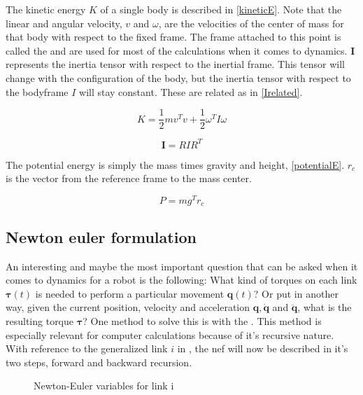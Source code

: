 The kinetic energy $K$ of a single body is described in \eqref{kineticE}. Note that the linear and angular velocity, $v$ and $\omega$, are the velocities of the center of mass for that body with respect to the fixed frame. The frame attached to this point is called the  and are used for most of the calculations when it comes to dynamics. $\mathbf{I}$ represents the inertia tensor with respect to the inertial frame.  This tensor will change with the configuration of the body, but the inertia tensor with respect to the \gls{bodyframe} $I$ will stay constant. These are related as in \eqref{Irelated}.

\begin{equation}\label{kineticE}
K = \frac{1}{2}mv^Tv + \frac{1}{2}\omega ^{T}  I \omega
\end{equation}

\begin{equation}\label{Irelated}
\mathbf{I} = RIR^T
\end{equation}

The potential energy is simply the mass times gravity and height, \eqref{potentialE}. $r_c$ is the vector from the reference frame to the mass center.

\begin{equation}\label{potentialE}
P = mg^Tr_c
\end{equation}



\subsection{Newton euler formulation}

An interesting and maybe the most important question that can be asked when it comes to dynamics for a robot is the following: What kind of torques on each link $\mathbf{\tau}(t)$ is needed to perform a particular movement $\mathbf{q}(t)$? Or put in another way, given the current position, velocity and acceleration $\mathbf{q}, \mathbf{\dot{q}}$ and $ \mathbf{\ddot{q}}$, what is the resulting torque $\mathbf{\tau}$? One method to solve this is with the . This method is especially relevant for computer calculations because of it's recursive nature. With reference to the generalized link $i$ in , the  \gls{nef} will now be described in it's two steps, forward and backward recursion.

\begin{figure}[h!]    
    \centering           
    \def\svgwidth{\columnwidth}
    
    \caption{Newton-Euler variables for link i}
    \label{newtonEuler}
\end{figure}

